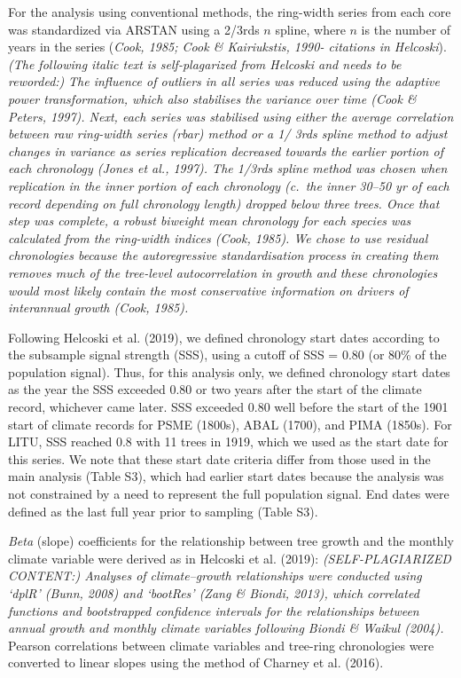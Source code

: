 \documentclass[
]{article}
\begin{document}
For the analysis using conventional methods, the ring-width series from
each core was standardized via ARSTAN using a 2/3rds \(n\) spline, where
\(n\) is the number of years in the series (\emph{Cook, 1985; Cook \&
Kairiukstis, 1990- citations in Helcoski}). \emph{(The following italic
text is self-plagarized from Helcoski and needs to be reworded:)}
\emph{The influence of outliers in all series was reduced using the
adaptive power transformation, which also stabilises the variance over
time (Cook \& Peters, 1997). Next, each series was stabilised using
either the average correlation between raw ring-width series (rbar)
method or a 1/ 3rds spline method to adjust changes in variance as
series replication decreased towards the earlier portion of each
chronology (Jones et al., 1997). The 1/3rds spline method was chosen
when replication in the inner portion of each chronology (c.~the inner
30--50 yr of each record depending on full chronology length) dropped
below three trees. Once that step was complete, a robust biweight mean
chronology for each species was calculated from the ring-width indices
(Cook, 1985). We chose to use residual chronologies because the
autoregressive standardisation process in creating them removes much of
the tree-level autocorrelation in growth and these chronologies would
most likely contain the most conservative information on drivers of
interannual growth (Cook, 1985).}

Following Helcoski et al. (2019), we defined chronology start dates
according to the subsample signal strength (SSS), using a cutoff of SSS
= 0.80 (or 80\% of the population signal). Thus, for this analysis only,
we defined chronology start dates as the year the SSS exceeded 0.80 or
two years after the start of the climate record, whichever came later.
SSS exceeded 0.80 well before the start of the 1901 start of climate
records for PSME (1800s), ABAL (1700), and PIMA (1850s). For LITU, SSS
reached 0.8 with 11 trees in 1919, which we used as the start date for
this series. We note that these start date criteria differ from those
used in the main analysis (Table S3), which had earlier start dates
because the analysis was not constrained by a need to represent the full
population signal. End dates were defined as the last full year prior to
sampling (Table S3).

\emph{Beta} (slope) coefficients for the relationship between tree
growth and the monthly climate variable were derived as in Helcoski et
al. (2019): \emph{(SELF-PLAGIARIZED CONTENT:) Analyses of
climate--growth relationships were conducted using `dplR' (Bunn, 2008)
and `bootRes' (Zang \& Biondi, 2013), which correlated functions and
bootstrapped confidence intervals for the relationships between annual
growth and monthly climate variables following Biondi \& Waikul (2004).}
Pearson correlations between climate variables and tree-ring
chronologies were converted to linear slopes using the method of Charney
et al. (2016).
\end{document}
